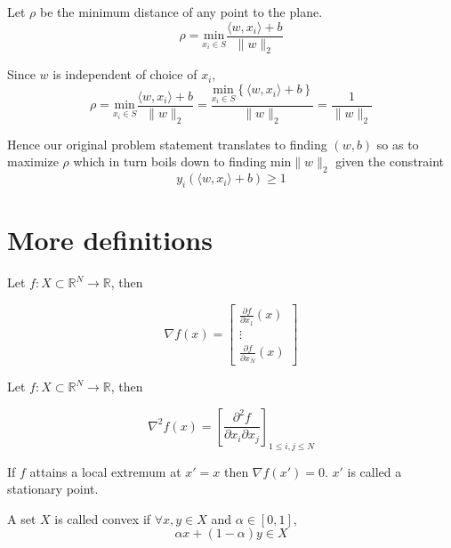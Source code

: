 \documentclass[a4paper,english,12pt]{article}
\begin{document}
Let $\rho$ be the minimum distance of any point to the plane.
$$ \rho = \underset{x_i \in S} {\mathrm{min}} \frac{\langle w,x_i \rangle + b}{\| w \|_2} $$

Since $w$ is independent of choice of $x_i$,
$$ \rho = \underset{x_i \in S} {\mathrm{min}} \frac{\langle w,x_i \rangle + b}{\| w \|_2} = \frac{\underset{x_i \in S} {\mathrm{min}} \left\{\langle w,x_i \rangle + b\right\}}{\| w \|_2} = \frac{1}{\|w\|_2} $$

Hence our original problem statement translates to finding $(w,b)$ so as to maximize $\rho$ which in turn boils down to finding $\mathrm{min} \|w\|_2$ given the constraint
$$ y_i \left(\langle w,x_i \rangle + b \right) \geq 1 $$

\section{More definitions}

\begin{defn}[Gradient]

Let $f:X\subset\mathbb{R}^N\rightarrow\mathbb{R}$, then

$$ \nabla f(x) = \left[  \begin{array}{ccc} \frac{\partial f}{\partial x_1} (x) \\ \vdots \\ \frac{\partial f}{\partial x_N} (x)
\end{array}  \right] $$

\end{defn}

\begin{defn}[Hessian]

Let $f:X\subset\mathbb{R}^N\rightarrow\mathbb{R}$, then

$$ \nabla ^2 f(x) = \left[  \frac{\partial ^2 f}{\partial x_i \partial x_j}  \right]_{1 \leq i, j \leq N} $$

\end{defn}

\begin{defn}
If $f$ attains a local extremum at $x' = x$ then $\nabla f(x') = 0$. $x'$ is called a stationary point.
\end{defn}

\begin{defn}
A set $X$ is called convex if $\forall x,y \in X$ and $\alpha \in [0,1]$,
$$ \alpha x + (1-\alpha) y \in X $$
\end{defn}
\end{document}

